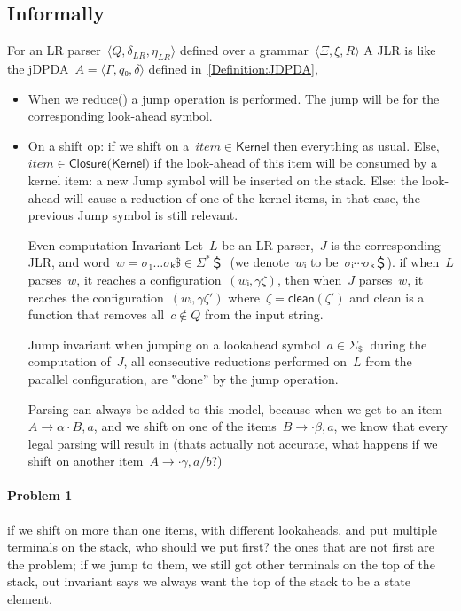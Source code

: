 \subsection{Informally}

For an LR parser~$⟨Q,δ_{LR}, η_{LR}⟩$ defined over a grammar~$⟨Ξ,ξ,R⟩$
A JLR is like the jDPDA~$A=⟨Γ,q₀,δ⟩$ defined in~\cref{Definition:JDPDA},

\begin{itemize}
  \item When we \textsf{reduce()} a jump operation is performed.
    The jump will be for the corresponding look-ahead symbol.
  \item On a shift op:
  if we shift on a~$item∈\textsf{Kernel}$
    then everything as usual.
  Else,~$item∈\textsf{Closure(Kernel)}$
      if the look-ahead of this item will be consumed by a kernel item:
        a new Jump symbol will be inserted on the stack.
      Else:
        the look-ahead will cause a reduction of one of the kernel items,
        in that case, the previous Jump symbol is still relevant.
  \item[Even computation Invariant]
    Let~$L$ be an LR parser,~$J$ is the corresponding JLR, and word~$w =σ₁…σₖ \$∈Σ^*＄~$ (we denote~$wᵢ$ to be~$σᵢ⋯σₖ ＄$).
    if when~$L$ parses~$w$, it reaches a configuration~$(wᵢ,γζ)$,
    then when~$J$ parses~$w$, it reaches the configuration~$(wᵢ,γζ')$ where~$ζ= \textsf{clean}(ζ')$
    and \textsf{clean} is a function that removes all~$c∉Q$ from the input string.
  \item[Jump invariant]
    when jumping on a lookahead symbol~$a∈Σ_\$~$ during the computation of~$J$,
    all consecutive reductions performed on~$L$ from the parallel configuration, are ‟done” by the \textsf{jump} operation.
  \item[Parsing] can always be added to this model, because when we get to an item~$A→α·B,a$, and we shift on
    one of the items~$B→·β,a$, we know that every legal parsing will result in (thats actually not accurate, what happens
    if we shift on another item~$A→·γ,a/b$?)
\end{itemize}
\paragraph{Problem 1} if we shift on more than one items, with different lookaheads,
  and put multiple terminals on the stack, who should we put first? the ones that are
  not first are the problem; if we jump to them, we still got other terminals on the
  top of the stack, out invariant says we always want the top of the stack to be a
  state element.


